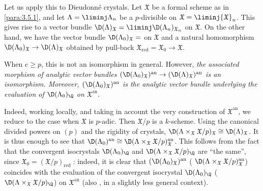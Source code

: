 \begin{para}\label{para:3.6.6} Let us apply this to Dieudonn\'e
 crystals. Let $\mathfrak{X}$ be a formal scheme as in \ref{para:3.5.1},
 and let 
 $\Lambda=\liminj \Lambda_n$ be a $p$-divisible on
 $\mathfrak{X}=\liminj {\mathfrak{X}}_n$. This gives rise to a vector bundle 
 $\displaystyle \D(\Lambda)_{\mathfrak{X}}= \liminj
 \D(\Lambda_n)_{{\mathfrak{X}}_n}$ on $\mathfrak{X}$. On the other 
 hand, we have the vector bundle $\displaystyle
 \D(\Lambda_0)_{\mathfrak{X}}=$ on $\mathfrak{X}$ and a natural
 homomorphism $\D(\Lambda_0)_{\mathfrak{X}}\rightarrow
 \D(\Lambda)_{\mathfrak{X}}$ obtained by pull-back 
 ${\mathfrak{X}}_{\mathrm{red}}={\mathfrak{X}}_0\rightarrow {\mathfrak{X}}$.


When $e\geq p$, this is not an isomorphism in general. However, {\it the
associated morphism of analytic vector bundles
$(\D(\Lambda_0)_{\mathfrak{X}})^{\mathrm{an}}\rightarrow
(\D(\Lambda)_{\mathfrak{X}})^{\mathrm{an}}$ is an isomorphism.  Moreover,
$(\D(\Lambda_0)_{\mathfrak{X}})^{\mathrm{an}}$ is the analytic vector bundle
underlying the evaluation of $\D(\Lambda_0)_\Q$ on
${\mathfrak{X}}^{\mathrm{an}}$}.


Indeed, working locally, and taking in account the very construction of
${\mathfrak{X}}^{\mathrm{an}}$, we reduce to the case when ${\mathfrak{X}}$ is
$p$-adic. Then $\mathfrak{X}/p$ is a $k$-scheme. Using the canonical
divided powers on $(p)$ and the rigidity of crystals,
$\D(\Lambda\times_{\mathfrak{X}}\mathfrak{X}/p)_{\mathfrak{X}}\cong
\D(\Lambda)_{\mathfrak{X}}$. It is thus enough to see that
$\D(\Lambda_0)^{\mathrm{an}}\cong\D
(\Lambda\times_{\mathfrak{X}}\mathfrak{X}/p)_{\mathfrak{X}}^{\mathrm{an}}$. This
follows from the fact that the convergent isocrystals $\D(\Lambda_0)_\Q$
and $\D(\Lambda\times_{\mathfrak{X}}\mathfrak{X}/p)_\Q$ are ``the
same'', since ${\mathfrak{X}}_0=({\mathfrak{X}}/p)_{\mathrm{red}}\;$: indeed, it
is clear that $(\D(\Lambda_0)_{\mathfrak{X}})^{\mathrm{an}}$ (\resp
$\D(\Lambda\times_{\mathfrak{X}}\mathfrak{X}/p)_{\mathfrak{X}}^{\mathrm{an}}$)
coincides with the evaluation of the convergent isocrystal
$\D(\Lambda_0)_\Q$ (\resp
$\D(\Lambda\times_{\mathfrak{X}}\mathfrak{X}/p)_\Q$) on
${\mathfrak{X}}^{\mathrm{an}}$ (\cf also \cite[6.4]{efgonas}, in a slightly less
general context).
\end{para}

